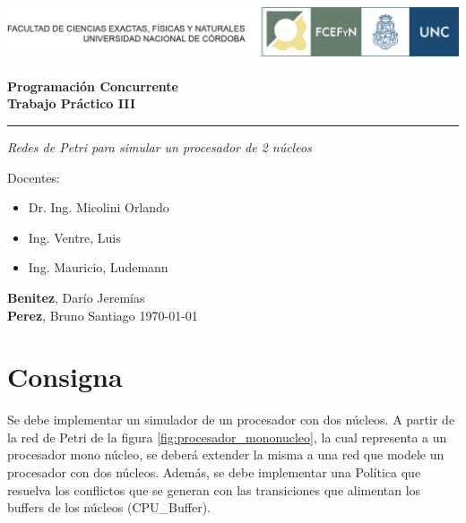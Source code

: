 \documentclass[a4paper,11pt]{article}
\begin{document}
    \begin{titlepage}
        \vspace*{1cm}
        \includegraphics[width=\textwidth]{images/logos-fcefyn-y-unc.png} \\
        \\
        {\fontsize{28}{34}\selectfont\bfseries Programación Concurrente} \\
        {\fontsize{28}{34}\selectfont\bfseries Trabajo Práctico III}
        \hfill
        
        {\color{gray}\hrule}
        \Large{\itshape Redes de Petri para simular un procesador de 2 núcleos}
        
        \vfill
   Docentes: 
    \begin{itemize}
        \item Dr. Ing. Micolini Orlando
        \item Ing. Ventre, Luis
        \item Ing. Mauricio, Ludemann
    \end{itemize} 
        \vfill
        
        {\textbf{Benitez}, Darío Jeremías} \\
        {\textbf{Perez}, Bruno Santiago \hfill \today}
    \end{titlepage}


    \tableofcontents

    \pagebreak

    \section{Consigna}
    
    Se debe implementar un simulador de un procesador con dos núcleos. A partir de la red de
    Petri de la figura \ref{fig:procesador_mononucleo}, la cual representa a un procesador mono núcleo, se deberá extender la
    misma a una red que modele un procesador con dos núcleos. Además, se debe
    implementar una Política que resuelva los conflictos que se generan con las transiciones
    que alimentan los buffers de los núcleos (CPU\_Buffer).
    
\end{document}
